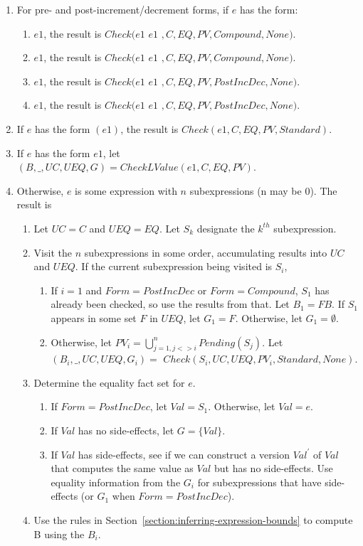 \begin{enumerate}
\item For pre- and post-increment/decrement forms, if $e$ has the form:
\begin{enumerate}
\item \code{++}$e1$, the result is  $Check(e1$ \code{ = } $e1$ $,C, EQ, PV, 
Compound, None)$.
\item \code{--}$e1$, the result is $Check(e1$ \code{ = } $e1$ $, C, EQ, PV,
Compound, None)$.
\item $e1$\code{++}, the result is  $Check(e1$ \code{ = } $ e1$ $,
C, EQ, PV, PostIncDec, None)$.
\item $e1$\code{--}, the result is $Check(e1$ \code{ = } $ e1$ $, C, EQ, PV, PostIncDec, None)$.
\end{enumerate}

\item If $e$ has the form $(e1)$, the result is $Check(e1, C, EQ, PV, Standard)$.

\item If $e$ has the form \code{&}$e1$, let $(B, \_, UC, UEQ, G) = CheckLValue(e1, C, EQ, PV)$.

\item Otherwise, $e$ is some expression with $n$ subexpressions (n may be 0).  The
result is 
\begin{enumerate}
\item Let $UC = C$ and $UEQ = EQ$.  Let $S_k$ designate the $k^{th}$ subexpression.
\item Visit the $n$ subexpressions in some order, accumulating results into $UC$ and $UEQ$.  If the current subexpression being visited is $S_i$,
\begin{enumerate}
\item If $i = 1$ and $Form = PostIncDec$ or $Form = Compound$, $S_1$ has already
been checked, so use the results from that.  Let $B_1 = FB$.  If $S_1$ appears in some set $F$ in $UEQ$,
 let $G_1 = F$.   Otherwise, let $G_1 = \emptyset$.
\item Otherwise,  let $PV_i = \bigcup_{j= 1, j <> i}^{n} Pending(S_j)$.
Let $(B_i, \_, UC, UEQ, G_i) =$  $Check(S_i, UC, UEQ, PV_i, Standard, None)$.
\end{enumerate}
\item Determine the equality fact set for $e$.
\begin{enumerate}
\item  If $Form = PostIncDec$, let $Val = S_1$.  Otherwise, let $Val = e$.
\item If $Val$ has no side-effects, let $G  = \{ Val \}$.
\item If $Val$ has side-effects, see if we can construct a version $Val^\prime$ of $Val$ that computes the same value as $Val$ but has no side-effects. Use equality information from the $G_i$ for
subexpressions that have side-effects (or $G_1$ when $Form = PostIncDec$).
\end{enumerate}
\item Use the rules in Section~\ref{section:inferring-expression-bounds} to compute B using the $B_i$.
\end{enumerate}
\end{enumerate}

